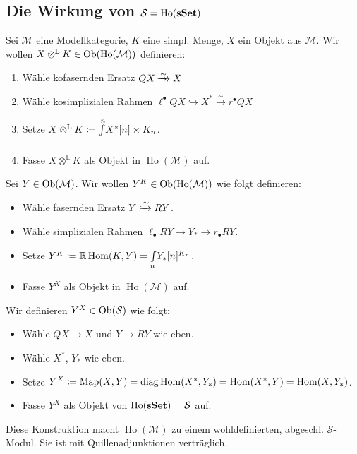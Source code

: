 \documentclass{cheat-sheet}
\newcommand{\nspace}[1]{\foreach \i in {1,...,#1}{ \! }} %
\newcommand{\xtwoheadrightarrow}[1]{\xrightarrow{#1}\nspace{8}\to\,\,} %
\newcommand{\ModC}{\mathcal{M}} %
\DeclareMathOperator{\Ho}{Ho} %
\newcommand{\LL}{\mathbb{L}} %
\newcommand{\RD}[1]{\mathbb{R} #1} %
\newcommand{\Simpl}{\mathcal{S}} %
\begin{document}
\subsection{Die Wirkung von $\Simpl = \Ho(\sSet)$}

\begin{konstr}
  Sei $\ModC$ eine Modellkategorie, $K$ eine simpl. Menge, $X$ ein Objekt aus $\ModC$.
  Wir wollen $X \otimes^{\LL} K \in \Ob(\Ho(\ModC))$ definieren:
  \begin{enumerate}[label=\alph*),leftmargin=2em]
    \item Wähle kofasernden Ersatz $QX \xtwoheadrightarrow{{\sim}} X$
    \item Wähle kosimplizialen Rahmen $\ell^\bullet Q X \hookrightarrow X^* \xrightarrow{{\sim}} r^\bullet Q X$
    \item Setze $X \otimes^{\LL} K \coloneqq \CoEndC{n}{X^*[n] \times K_n}$.
    \item Fasse $X \otimes^{\LL} K$ als Objekt in $\Ho(\ModC)$ auf.
  \end{enumerate}

  Sei $Y \in \Ob(\ModC)$.
  Wir wollen $Y^K \in \Ob(\Ho(\ModC))$ wie folgt definieren:
  \begin{itemize}
    \item Wähle fasernden Ersatz $Y \xhookrightarrow{{\sim}} RY$.
    \item Wähle simplizialen Rahmen $\ell_\bullet RY \to Y_* \to r_\bullet RY$.
    \item Setze $Y^K \coloneqq \RD \Hom(K, Y) = \EndC{n} Y_*[n]^{K_n}$.
    \item Fasse $Y^K$ als Objekt in $\Ho(\ModC)$ auf.
  \end{itemize}

  Wir definieren $Y^X \in \Ob(\Simpl)$ wie folgt:
  \begin{itemize}
    \item Wähle $QX \to X$ und $Y \to RY$ wie eben.
    \item Wähle $X^*$, $Y_*$ wie eben.
    \item Setze $Y^X \coloneqq \text{Map}(X, Y) = \text{diag} \operatorname{Hom}(X^*, Y_*) = \operatorname{Hom}(X^*, Y) = \operatorname{Hom}(X, Y_*)$.
    \item Fasse $Y^X$ als Objekt von $\Ho(\sSet) = \Simpl$ auf.
  \end{itemize}
\end{konstr}

\begin{satz}
  Diese Konstruktion macht $\Ho(\ModC)$ zu einem wohldefinierten, abgeschl. $\Simpl$-Modul.
  Sie ist mit Quillenadjunktionen verträglich. %
\end{satz}
\end{document}
